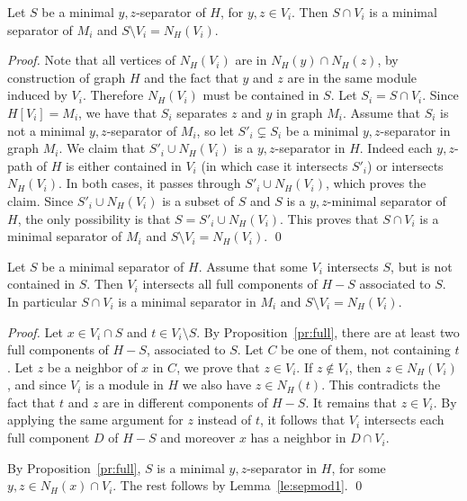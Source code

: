 \documentclass{llncs}
\begin{document}
\begin{lemma}\label{le:sepmod1}
Let $S$ be a minimal $y,z$-separator of $H$, for $y,z \in V_i$. Then $S \cap V_i$ is a minimal separator of $M_i$ and $S \setminus V_i = N_H(V_i)$. 
\end{lemma}
\begin{proof}
Note that all vertices of $N_H(V_i)$ are in $N_H(y) \cap N_H(z)$, by construction of graph $H$ and the fact that $y$ and $z$ are in the same module induced by $V_i$. Therefore $N_H(V_i)$ must be contained in $S$. Let $S_i = S \cap V_i$. Since $H[V_i] = M_i$, we have that $S_i$ separates $z$ and $y$ in graph $M_i$. Assume that $S_i$ is not a minimal $y,z$-separator of $M_i$, so let $S'_i \subsetneq S_i$ be a minimal $y,z$-separator in graph $M_i$. We claim that $S'_i \cup N_H(V_i)$ is a $y,z$-separator in $H$. Indeed each $y,z$-path of $H$ is either contained in $V_i$ (in which case it intersects $S'_i$) or intersects $N_H(V_i)$. In both cases, it passes through $S'_i \cup N_H(V_i)$, which proves the claim. Since $S'_i \cup N_H(V_i)$ is a subset of $S$ and $S$ is a $y,z$-minimal separator of $H$, the only possibility is that $S = S'_i \cup N_H(V_i)$. This proves that $S \cap V_i$ is a minimal separator of 
$M_i$ and $S \setminus V_i = N_H(V_i)$.
\qed
\end{proof}

\begin{lemma}\label{le:sepmod}
Let $S$ be a minimal separator of $H$. Assume that some $V_i$ intersects $S$, but is not contained in $S$.
Then $V_i$ intersects all full components of $H - S$ associated to $S$. In particular $S \cap V_i$ is a minimal separator in $M_i$ and 
$S \setminus V_i = N_H(V_i)$.
\end{lemma}
\begin{proof}
Let $x \in V_i \cap S$ and $t \in V_i \setminus S$. 
By Proposition~\ref{pr:full}, there are at least two full  components of $H - S$, associated to $S$. Let $C$ be one of them, not containing $t$. Let $z$ be a neighbor of $x$ in $C$, we prove that $z \in V_i$. If $z \not\in V_i$, then $z \in N_H(V_i)$, and since $V_i$ is a module in $H$ we also have $z \in N_H(t)$. This contradicts the fact that $t$ and $z$ are in different components of $H - S$. It remains that  $z \in V_i$. By applying the same argument for $z$ instead of $t$, it follows that $V_i$ intersects each full component $D$ of $H - S$ and moreover $x$ has a neighbor in $D \cap V_i$. 

By Proposition~\ref{pr:full}, $S$ is a minimal $y,z$-separator in $H$, for some $y, z \in N_H(x) \cap V_i$. The rest follows by Lemma~\ref{le:sepmod1}.
\qed
\end{proof}
\end{document}

